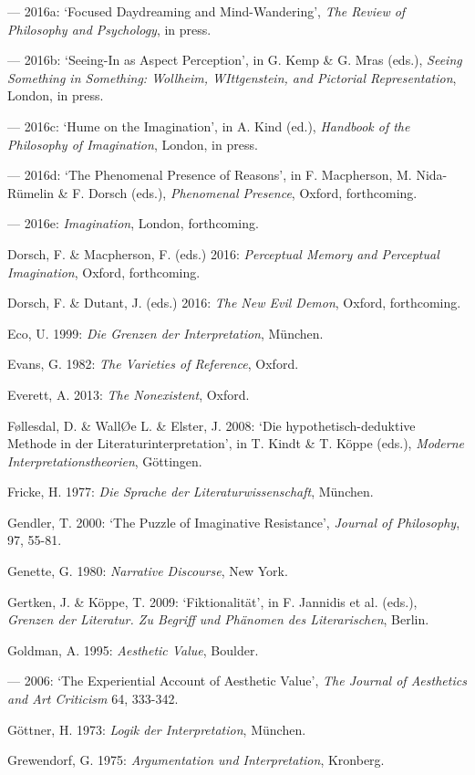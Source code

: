 \begin{hangparas}{.5cm}{1}
--- 2016a: `Focused Daydreaming and Mind-Wandering', \emph{The Review of Philosophy and Psychology}, in press.
 
--- 2016b: `Seeing-In as Aspect Perception', in G. Kemp \& G. Mras (eds.), \emph{Seeing Something in Something: Wollheim, WIttgenstein, and Pictorial Representation}, London, in press.

--- 2016c: `Hume on the Imagination', in A. Kind (ed.), \emph{Handbook of the Philosophy of Imagination}, London, in press.
 
--- 2016d: `The Phenomenal Presence of Reasons', in F. Macpherson, M. Nida-R\"umelin \& F. Dorsch (eds.), \emph{Phenomenal Presence}, Oxford, forthcoming. 
 
--- 2016e: \emph{Imagination}, London, forthcoming.

Dorsch, F. \& Macpherson, F. (eds.) 2016: \emph{Perceptual Memory and Perceptual Imagination}, Oxford, forthcoming. 

Dorsch, F. \& Dutant, J. (eds.) 2016: \emph{The New Evil Demon}, Oxford, forthcoming.

Eco, U. 1999: \emph{Die Grenzen der Interpretation}, M\"unchen. 

Evans, G. 1982: \emph{The Varieties of Reference}, Oxford. 

Everett, A. 2013: \emph{The Nonexistent}, Oxford. 

F\o{}llesdal, D. \& Wall\O{}e L. \& Elster, J. 2008: `Die hypothetisch-deduktive Methode in der Literaturinterpretation', in T. Kindt \& T. K\"oppe (eds.), \emph{Moderne Interpretationstheorien}, G\"ottingen.

Fricke, H. 1977: \emph{Die Sprache der Literaturwissenschaft}, M\"unchen.

Gendler, T. 2000: `The Puzzle of Imaginative Resistance', \emph{Journal of Philosophy}, 97, 55-81.

Genette, G. 1980: \emph{Narrative Discourse}, New York. 

Gertken, J. \& K\"oppe, T. 2009: `Fiktionalit\"at', in F. Jannidis et al. (eds.), \emph{Grenzen der Literatur. Zu Begriff und Ph\"anomen des Literarischen}, Berlin. 

Goldman, A. 1995: \emph{Aesthetic Value}, Boulder. 

--- 2006: `The Experiential Account of Aesthetic Value', \emph{The Journal of Aesthetics and Art Criticism} 64, 333-342.

G\"ottner, H. 1973: \emph{Logik der Interpretation}, M\"unchen.

Grewendorf, G. 1975: \emph{Argumentation und Interpretation}, Kronberg.


\end{hangparas}
